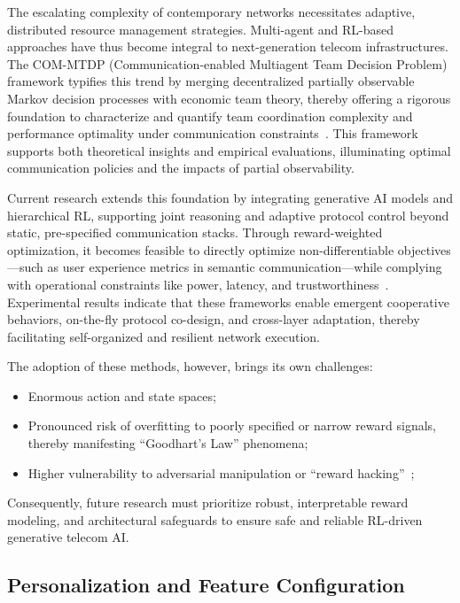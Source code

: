 \documentclass[sigconf]{acmart}
\begin{document}
The escalating complexity of contemporary networks necessitates adaptive, distributed resource management strategies. Multi-agent and RL-based approaches have thus become integral to next-generation telecom infrastructures. The COM-MTDP (Communication-enabled Multiagent Team Decision Problem) framework typifies this trend by merging decentralized partially observable Markov decision processes with economic team theory, thereby offering a rigorous foundation to characterize and quantify team coordination complexity and performance optimality under communication constraints~\cite{ref32}. This framework supports both theoretical insights and empirical evaluations, illuminating optimal communication policies and the impacts of partial observability.

Current research extends this foundation by integrating generative AI models and hierarchical RL, supporting joint reasoning and adaptive protocol control beyond static, pre-specified communication stacks. Through reward-weighted optimization, it becomes feasible to directly optimize non-differentiable objectives---such as user experience metrics in semantic communication---while complying with operational constraints like power, latency, and trustworthiness~\cite{ref1,ref26,ref36}. Experimental results indicate that these frameworks enable emergent cooperative behaviors, on-the-fly protocol co-design, and cross-layer adaptation, thereby facilitating self-organized and resilient network execution.

The adoption of these methods, however, brings its own challenges:

\begin{itemize}
    \item Enormous action and state spaces;
    \item Pronounced risk of overfitting to poorly specified or narrow reward signals, thereby manifesting ``Goodhart’s Law'' phenomena;
    \item Higher vulnerability to adversarial manipulation or ``reward hacking''~\cite{ref1};
\end{itemize}

Consequently, future research must prioritize robust, interpretable reward modeling, and architectural safeguards to ensure safe and reliable RL-driven generative telecom AI.

\subsection{Personalization and Feature Configuration}
\end{document}

